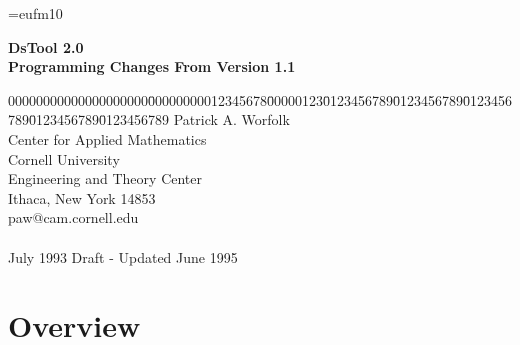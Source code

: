

\oddsidemargin 0.25in
\topmargin 0.25in
\headheight 0.25in

\textwidth 6in 
\headsep 0in
\textheight 8.25in

\font\setfont=eufm10




\begin{center}
{\LARGE \bf DsTool 2.0}  \\
\vspace{.15in}
{\large \bf Programming Changes From Version 1.1}
\end{center}

\vspace{.2in}
\begin{tabbing}
00000000000000000000\=00000000012345678\=00000123\=0123456789\=0123456789\=0123456789\=0123456789\=0123456789 \kill
{} \> Patrick A. Worfolk \\
\>	       \> Center for Applied Mathematics  \\
\>	       \> Cornell University \\
\>	        Engineering and Theory Center \\
\>	       \> Ithaca, New York \hspace{.1in}  14853 \\
\>	       \> paw@cam.cornell.edu \\
\>	       \> \  \\
 \> July 1993  Draft - Updated June 1995\\
\end{tabbing}
\vspace{.2in}



\section{Overview}

